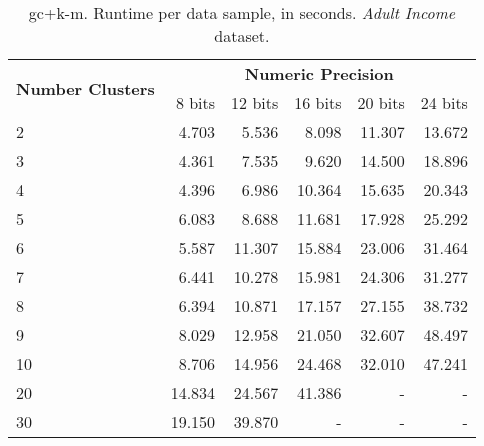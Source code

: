 \begin{table}[h]
\centering
\caption{\acs{gc}+\acs{k-m}. Runtime per data sample, in seconds. \emph{Adult Income} dataset.}
\label{table:runtimeKMAI}
\vspace*{0.2cm}
\begin{tabular}{|l|r|r|r|r|r|}
\hline
\multirow{2}{*}{\textbf{Number Clusters}} & \multicolumn{5}{c|}{\textbf{Numeric Precision}}                                              \\ \cline{2-6}
                                          & 8 bits & 12 bits & 16 bits & 20 bits & 24 bits \\ \hline
2                                & 4.703           & 5.536            & 8.098            & 11.307           & 13.672           \\ \hline
3                                & 4.361           & 7.535            & 9.620            & 14.500           & 18.896           \\ \hline
4                                & 4.396           & 6.986            & 10.364           & 15.635           & 20.343           \\ \hline
5                                & 6.083           & 8.688            & 11.681           & 17.928           & 25.292           \\ \hline
6                                & 5.587           & 11.307           & 15.884           & 23.006           & 31.464           \\ \hline
7                                & 6.441           & 10.278           & 15.981           & 24.306           & 31.277           \\ \hline
8                                & 6.394           & 10.871           & 17.157           & 27.155           & 38.732           \\ \hline
9                                & 8.029           & 12.958           & 21.050           & 32.607           & 48.497           \\ \hline
10                               & 8.706           & 14.956           & 24.468           & 32.010           & 47.241           \\ \hline
20                               & 14.834          & 24.567           & 41.386           & -                & -                \\ \hline
30                               & 19.150          & 39.870           & -                & -                & -                \\ \hline

\end{tabular}
\end{table}
